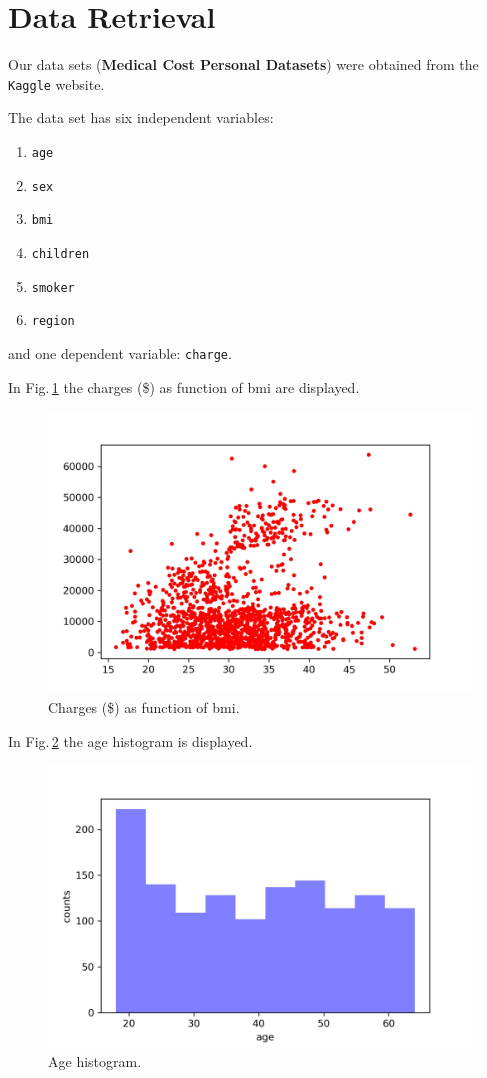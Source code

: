 \section{Data Retrieval}
Our data sets (\textbf{Medical Cost Personal Datasets}) were obtained from the \texttt{Kaggle} website\cite{kaggle:2022a}.

The data set has six independent variables:
\begin{enumerate}
\item \texttt{age} 
\item \texttt{sex} 
\item \texttt{bmi} 
\item \texttt{children} 
\item \texttt{smoker}
\item \texttt{region}	
\end{enumerate}
and one dependent variable: \texttt{charge}.

In Fig.\,\ref{fig:chargesfuncofbmi} the charges (\$) as function of bmi are displayed.
\begin{figure}[h]
   \centering
	\includegraphics{../img/imgpy1.jpeg}
	\caption{Charges (\$) as function of bmi.}
  \label{fig:chargesfuncofbmi}
\end{figure}

In Fig.\,\ref{fig:countsofage} the age histogram is displayed.
\begin{figure}[h]
   \centering
        \includegraphics{../img/imgpy2.jpeg}
        \caption{Age histogram.}
  \label{fig:countsofage}
\end{figure}

